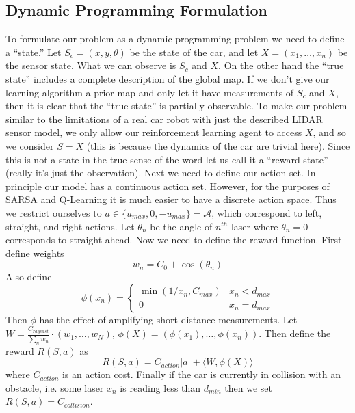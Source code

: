 \documentclass{article}
\begin{document}
\subsection{Dynamic Programming Formulation}
To formulate our problem as a dynamic programming problem we need to define a ``state.'' 
%
Let $S_c = (x,y,\theta)$ be the state of the car, and let $X  = (x_1,\ldots,x_n)$ be the sensor state. What we can observe is $S_c$ and $X$. On the other hand the ``true state'' includes a complete description of the global map. If we don't give our learning algorithm a prior map and only let it have measurements of $S_c$ and $X$, then it is clear that the ``true state'' is partially observable. To make our problem similar to the limitations of a real car robot with just the described LIDAR sensor model, we only allow our reinforcement learning agent to access $X$, and so we consider $S = X$ (this is because the dynamics of the car are trivial here). Since this is not a state in the true sense of the word let us call it a ``reward state'' (really it's just the observation).  Next we need to define our action set. In principle our model has a continuous action set. However, for the purposes of SARSA and Q-Learning it is much easier to have a discrete action space. Thus we restrict ourselves to $a \in \{u_{max},0,-u_{max}\} = \mathcal{A}$, which correspond to left, straight, and right actions. Let $\theta_n$ be the angle of $n^{th}$ laser where $\theta_n = 0$ corresponds to straight ahead. Now we need to define the reward function. First define weights
%
%
\begin{equation}
w_n = C_0 + \cos(\theta_n)
\end{equation}
%
%
Also define
%
%
\begin{equation}
\phi(x_n) = \begin{cases}
\min(1/x_n, C_{max}) & x_n < d_{max}\\
0 & x_n = d_{max} 
\end{cases}
\end{equation}
%
%
Then $\phi$ has the effect of amplifying short distance measurements. Let $W = \frac{C_{raycast}}{\sum_n w_n} \cdot (w_1,\ldots,w_N)$, $\phi(X) = (\phi(x_1),\ldots,\phi(x_n))$. Then define the reward $R(S,a)$ as
%
%
\begin{equation}
R(S,a) = C_{action} |a| + \langle W, \phi(X) \rangle
\end{equation}
%
%
where $C_{action}$ is an action cost. Finally if the car is currently in collision with an obstacle, i.e. some laser $x_n$ is reading less than $d_{min}$ then we set $R(S,a) = C_{collision}$.
\end{document}

